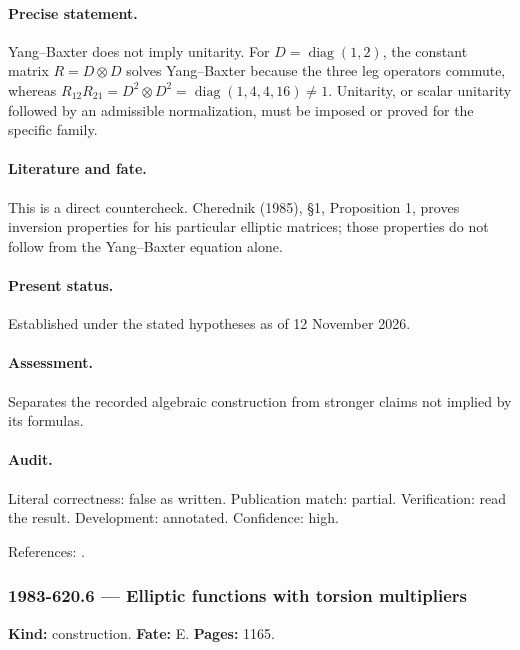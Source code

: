 \paragraph{Precise statement.} Yang–Baxter does not imply unitarity. For \(D=\operatorname{diag}(1,2)\), the constant matrix \(R=D\otimes D\) solves Yang–Baxter because the three leg operators commute, whereas \(R_{12}R_{21}=D^2\otimes D^2=\operatorname{diag}(1,4,4,16)\ne1\). Unitarity, or scalar unitarity followed by an admissible normalization, must be imposed or proved for the specific family.

\paragraph{Literature and fate.} This is a direct countercheck. Cherednik (1985), \S1, Proposition 1, proves inversion properties for his particular elliptic matrices; those properties do not follow from the Yang–Baxter equation alone.

\paragraph{Present status.} Established under the stated hypotheses as of 12 November 2026.

\paragraph{Assessment.} Separates the recorded algebraic construction from stronger claims not implied by its formulas.

\paragraph{Audit.} Literal correctness: false as written. Publication match: partial. Verification: read the result. Development: annotated. Confidence: high.

\noindent References: \citep{cherednik1985finite}.\par

\subsubsection{1983-620.6 --- Elliptic functions with torsion multipliers}

\label{item:1983-620.6}

\noindent\textbf{Kind:} construction. \textbf{Fate:} E. \textbf{Pages:} 1165.\par

